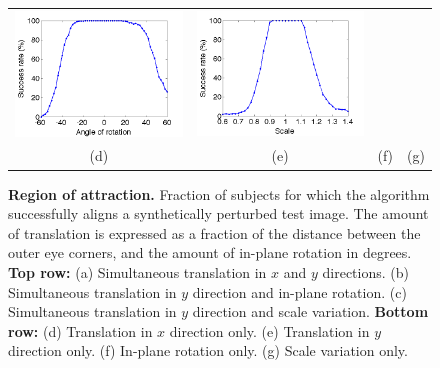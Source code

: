 \begin{figure}
{\begin{tabular}{cccc}
\includegraphics[height=\tempheightb]{figures_pami/theta.png} &
\includegraphics[height=\tempheightb]{figures_pami/scale.png}\\
(d)&(e)&(f)& (g)
\end{tabular}
} \caption{\small{\bf Region of attraction.} Fraction of
subjects for which the algorithm successfully aligns a
synthetically perturbed test image.  The amount of translation
is expressed as a fraction of the distance between the outer
eye corners, and the amount of in-plane rotation in degrees.
{\bf Top row:} (a) Simultaneous translation in $x$ and $y$
directions. (b) Simultaneous translation in $y$ direction and
in-plane rotation. (c) Simultaneous translation in $y$
direction and scale variation. {\bf Bottom row:} (d)
Translation in $x$ direction only. (e) Translation in $y$
direction only. (f) In-plane rotation only. (g) Scale variation
only.} \label{fig:attraction} 
\end{figure}

